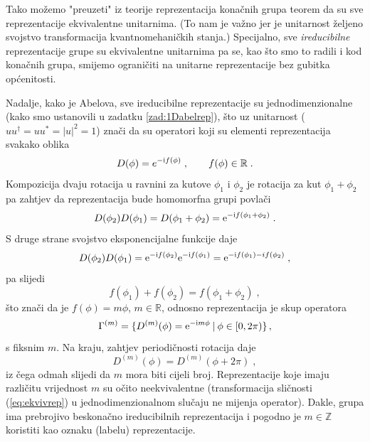 Tako možemo "preuzeti" iz teorije reprezentacija konačnih grupa
teorem da su sve reprezentacije ekvivalentne unitarnima. (To nam je važno
jer je unitarnost željeno svojstvo transformacija kvantnomehaničkih stanja.)
Specijalno, sve \emph{ireducibilne} reprezentacije grupe  su ekvivalentne unitarnima
pa se, kao što smo to radili i kod konačnih grupa, smijemo ograničiti na
unitarne reprezentacije bez gubitka općenitosti. 

Nadalje, kako je  Abelova, sve ireducibilne reprezentacije
su jednodimenzionalne (kako smo ustanovili u zadatku \ref{zad:1Dabelrep}),
što uz unitarnost ($uu^\dagger = uu^* = |u|^2=1$) znači da su operatori koji
su elementi reprezentacija svakako oblika
\begin{equation}
D(\phi)=e ^{-\textrm{i} f(\phi)} \;, \qquad f(\phi) \in \mathbb{R} \;.
\end{equation}
Kompozicija dvaju rotacija u ravnini za kutove $\phi_1$ i $\phi_2$ je rotacija za
kut $\phi_1 + \phi_2$ pa zahtjev da reprezentacija bude
homomorfna grupi povlači
\begin{equation}
   D(\phi_2) D(\phi_1) = D(\phi_1+\phi_2) = \textrm{e}^{-\textrm{i} f(\phi_1 + \phi_2)}\;.
\end{equation}
S druge strane svojstvo eksponencijalne funkcije daje
\begin{equation}
   D(\phi_2) D(\phi_1) = \textrm{e}^{-\textrm{i} f(\phi_2)} \textrm{e}^{-\textrm{i} f(\phi_1)} =  \textrm{e}^{-\textrm{i} f(\phi_1) - i f(\phi_2)}\;,
\end{equation}
pa slijedi
\begin{equation}
   f(\phi_1)+f(\phi_2) = f(\phi_1+\phi_2) \;,
\end{equation}
što znači da je $f(\phi)=m\phi$, $m\in\mathbb{R}$, odnosno
reprezentacija je skup operatora
\begin{equation}
    \Gamma^{(m)} = \{ D^{(m)}(\phi) = \textrm{e}^{-\textrm{i} m \phi} \: | \:  \phi \in [0, 2\pi)\}\,,
\end{equation}
s fiksnim $m$.  Na kraju, zahtjev periodičnosti rotacija daje
\begin{equation}
D^{(m)}(\phi)=D^{(m)}(\phi + 2\pi) \;,
\end{equation}
iz čega odmah slijedi da $m$ mora biti cijeli broj.
Reprezentacije koje imaju različitu vrijednost $m$ su očito
neekvivalentne (transformacija sličnosti (\ref{eq:ekvivrep})
u jednodimenzionalnom slučaju ne mijenja operator).
Dakle, grupa  ima prebrojivo beskonačno ireducibilnih
reprezentacija i pogodno
je $m \in \mathbb{Z}$ koristiti kao oznaku (labelu) reprezentacije.

